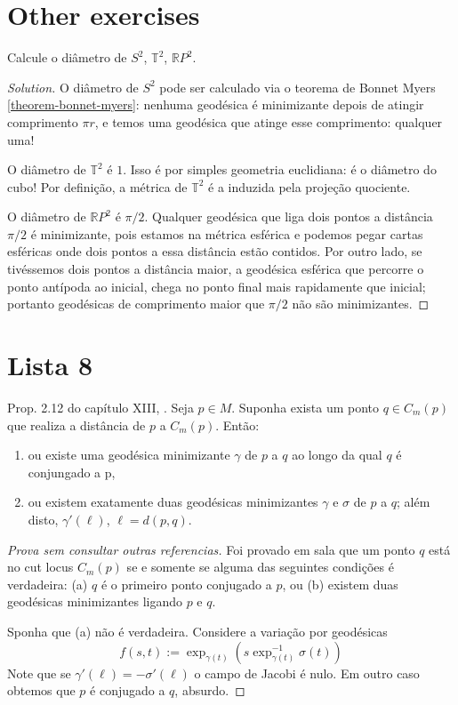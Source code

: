 \section{Other exercises}
\label{section-other-exercises}

\begin{exercise}
Calcule o diâmetro de $S^2$, $\mathbb{T}^2$, $\mathbb{R}P^{2}$.
\end{exercise}

\begin{proof}[Solution]
O diâmetro de $S^2$ pode ser calculado via o teorema de Bonnet Myers
\ref{theorem-bonnet-myers}: nenhuma geodésica é minimizante depois de atingir
comprimento $\pi r$, e temos uma geodésica que atinge esse comprimento: qualquer
uma!

O diâmetro de $\mathbb{T}^2$ é $1$. Isso é por simples geometria
euclidiana: é o diâmetro do cubo! Por definição, a métrica de  $\mathbb{T}^2$ é
a induzida pela projeção quociente.

O diâmetro de $\mathbb{R}P^{2}$ é $\pi/2$. Qualquer geodésica que liga dois
pontos a distância $\pi/2$ é minimizante, pois estamos na métrica esférica e
podemos pegar cartas esféricas onde dois pontos a essa distância estão contidos. 
Por outro lado, se tivéssemos dois pontos a distância maior, a geodésica 
esférica que percorre o ponto antípoda ao inicial, chega no ponto final mais 
rapidamente que inicial; portanto geodésicas de comprimento maior que $\pi/2$ 
não são minimizantes.
\end{proof}

\section{Lista 8}
\label{section-l8}

\begin{exercise}
Prop. 2.12 do capítulo XIII, \cite{doc}. Seja $p \in M$. Suponha exista um ponto $q \in C_m(p)$ que realiza a distância de $p$ a $C_m(p)$. Então:
\begin{enumerate}
\item ou existe uma geodésica minimizante $\gamma$ de $p$ a $q$ ao longo da qual $q$ é conjungado a p,
\item ou existem exatamente duas geodésicas minimizantes $\gamma$ e $\sigma$ de $p$ a $q$; além disto, $\gamma'(\ell)$, $\ell=d(p,q)$.
\end{enumerate}
\end{exercise}

\begin{proof}[Prova sem consultar outras referencias]
Foi provado em sala que um ponto $q$ está no cut locus $C_m(p)$ se e somente se
alguma das seguintes condições é verdadeira: (a) $q$ é o primeiro ponto
conjugado a $p$, ou (b) existem duas geodésicas minimizantes ligando $p$ e $q$.

Sponha que (a) não é verdadeira. Considere a variação por geodésicas 
$$
f(s,t):=\operatorname{exp}_{\gamma(t)}
(s\operatorname{exp}_{\gamma(t)}^{-1}\sigma(t))
$$
Note que se $\gamma'(\ell)=-\sigma'(\ell)$ o campo de Jacobi é nulo. Em outro
caso obtemos que $p$ é conjugado a $q$, absurdo.
\end{proof}

